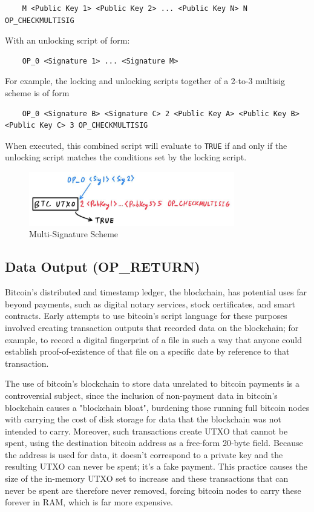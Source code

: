 \documentclass{article}
\begin{document}
    \begin{lstlisting}
    M <Public Key 1> <Public Key 2> ... <Public Key N> N OP_CHECKMULTISIG 
    \end{lstlisting}

    With an unlocking script of form:
    \begin{lstlisting}
    OP_0 <Signature 1> ... <Signature M>
    \end{lstlisting}

    For example, the locking and unlocking scripts together of a 2-to-3 multisig scheme is of form
    \begin{lstlisting}
    OP_0 <Signature B> <Signature C> 2 <Public Key A> <Public Key B> <Public Key C> 3 OP_CHECKMULTISIG
    \end{lstlisting}

    When executed, this combined script will evaluate to \texttt{TRUE} if and only if the unlocking script matches the conditions set by the locking script.

    \begin{figure}[H]
    \centering
    \includegraphics[width=0.8\textwidth]{img/multisig.jpg}
    \caption{Multi-Signature Scheme}
    \end{figure}

  \subsection{Data Output (OP\_RETURN)}

    Bitcoin's distributed and timestamp ledger, the blockchain, has potential uses far beyond payments, such as digital notary services, stock certificates, and smart contracts. Early attempts to use bitcoin's script language for these purposes involved creating transaction outputs that recorded data on the blockchain; for example, to record a digital fingerprint of a file in such a way that anyone could establish proof-of-existence of that file on a specific date by reference to that transaction.

    The use of bitcoin's blockchain to store data unrelated to bitcoin payments is a controversial subject, since the inclusion of non-payment data in bitcoin's blockchain causes a "blockchain bloat", burdening those running full bitcoin nodes with carrying the cost of disk storage for data that the blockchain was not intended to carry. Moreover, such transactions create UTXO that cannot be spent, using the destination bitcoin address as a free-form 20-byte field. Because the address is used for data, it doesn't correspond to a private key and the resulting UTXO can never be spent; it's a fake payment. This practice causes the size of the in-memory UTXO set to increase and these transactions that can never be spent are therefore never removed, forcing bitcoin nodes to carry these forever in RAM, which is far more expensive.
\end{document}

